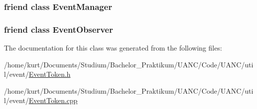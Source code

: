 \subsubsection[{\texorpdfstring{Event\+Manager}{EventManager}}]{\setlength{\rightskip}{0pt plus 5cm}friend class {\bf Event\+Manager}\hspace{0.3cm}{\ttfamily [friend]}}\hypertarget{classuanc_1_1util_1_1event_1_1_event_token_aba45a46c615e2683daffdae82e2d3b8f}{}\label{classuanc_1_1util_1_1event_1_1_event_token_aba45a46c615e2683daffdae82e2d3b8f}
\subsubsection[{\texorpdfstring{Event\+Observer}{EventObserver}}]{\setlength{\rightskip}{0pt plus 5cm}friend class {\bf Event\+Observer}\hspace{0.3cm}{\ttfamily [friend]}}\hypertarget{classuanc_1_1util_1_1event_1_1_event_token_a7512992e19dc2f4613dea5e056e626f9}{}\label{classuanc_1_1util_1_1event_1_1_event_token_a7512992e19dc2f4613dea5e056e626f9}


The documentation for this class was generated from the following files\+:\begin{DoxyCompactItemize}
\item 
/home/kurt/\+Documents/\+Studium/\+Bachelor\+\_\+\+Praktikum/\+U\+A\+N\+C/\+Code/\+U\+A\+N\+C/util/event/\hyperlink{_event_token_8h}{Event\+Token.\+h}\item 
/home/kurt/\+Documents/\+Studium/\+Bachelor\+\_\+\+Praktikum/\+U\+A\+N\+C/\+Code/\+U\+A\+N\+C/util/event/\hyperlink{_event_token_8cpp}{Event\+Token.\+cpp}\end{DoxyCompactItemize}
